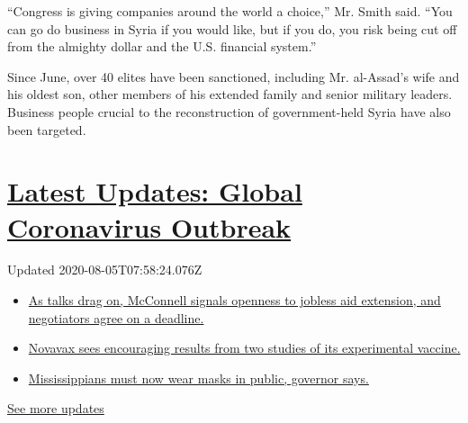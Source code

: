 ``Congress is giving companies around the world a choice,'' Mr. Smith
said. ``You can go do business in Syria if you would like, but if you
do, you risk being cut off from the almighty dollar and the U.S.
financial system.''

Since June, over 40 elites have been sanctioned, including Mr.
al-Assad's wife and his oldest son, other members of his extended family
and senior military leaders. Business people crucial to the
reconstruction of government-held Syria have also been targeted.

\hypertarget{latest-updates-global-coronavirus-outbreak}{%
\section{\texorpdfstring{\href{https://www.nytimes3xbfgragh.onion/2020/08/04/world/coronavirus-cases.html?action=click\&pgtype=Article\&state=default\&region=MAIN_CONTENT_1\&context=storylines_live_updates}{Latest
Updates: Global Coronavirus
Outbreak}}{Latest Updates: Global Coronavirus Outbreak}}\label{latest-updates-global-coronavirus-outbreak}}

Updated 2020-08-05T07:58:24.076Z

\begin{itemize}
\tightlist
\item
  \href{https://www.nytimes3xbfgragh.onion/2020/08/04/world/coronavirus-cases.html?action=click\&pgtype=Article\&state=default\&region=MAIN_CONTENT_1\&context=storylines_live_updates\#link-762df92}{As
  talks drag on, McConnell signals openness to jobless aid extension,
  and negotiators agree on a deadline.}
\item
  \href{https://www.nytimes3xbfgragh.onion/2020/08/04/world/coronavirus-cases.html?action=click\&pgtype=Article\&state=default\&region=MAIN_CONTENT_1\&context=storylines_live_updates\#link-1228a480}{Novavax
  sees encouraging results from two studies of its experimental
  vaccine.}
\item
  \href{https://www.nytimes3xbfgragh.onion/2020/08/04/world/coronavirus-cases.html?action=click\&pgtype=Article\&state=default\&region=MAIN_CONTENT_1\&context=storylines_live_updates\#link-794484ed}{Mississippians
  must now wear masks in public, governor says.}
\end{itemize}

\href{https://www.nytimes3xbfgragh.onion/2020/08/04/world/coronavirus-cases.html?action=click\&pgtype=Article\&state=default\&region=MAIN_CONTENT_1\&context=storylines_live_updates}{See
more updates}

